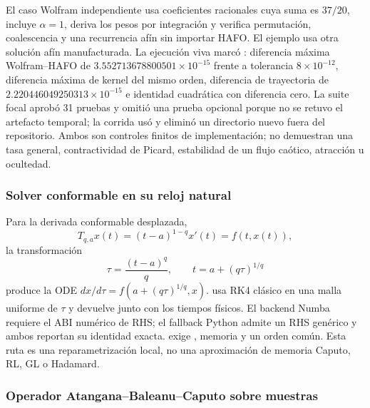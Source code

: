 El caso Wolfram independiente usa coeficientes racionales cuya suma es
\(37/20\), incluye \(\alpha=1\), deriva los pesos por integración y verifica
permutación, coalescencia y una recurrencia afín sin importar HAFO. El ejemplo
 usa otra solución afín manufacturada.
La ejecución viva marcó : diferencia máxima
Wolfram--HAFO de \(3.552713678800501\times10^{-15}\) frente a tolerancia
\(8\times10^{-12}\), diferencia máxima de kernel del mismo orden, diferencia
de trayectoria de \(2.220446049250313\times10^{-15}\) e identidad cuadrática
con diferencia cero. La suite focal aprobó 31 pruebas y omitió una prueba
opcional porque no se retuvo el artefacto temporal; la corrida usó y eliminó un
directorio nuevo fuera del repositorio.
Ambos son controles finitos de implementación; no demuestran una tasa general,
contractividad de Picard, estabilidad de un flujo caótico, atracción u
ocultedad.

\subsubsection{Solver conformable en su reloj natural}

Para la derivada conformable desplazada,
\[
 T_{q,a}x(t)=(t-a)^{1-q}x'(t)=f(t,x(t)),
\]
la transformación
\[
 \tau=\frac{(t-a)^q}{q},\qquad
 t=a+(q\tau)^{1/q}
\]
produce la ODE \(dx/d\tau=f(a+(q\tau)^{1/q},x)\).
 usa RK4 clásico en una malla uniforme de
\(\tau\) y devuelve  junto con los tiempos físicos. El
backend Numba requiere el ABI numérico de RHS; el fallback Python admite un RHS
genérico y ambos reportan su identidad exacta. 
exige , memoria
 y un orden común. Esta ruta es una reparametrización local, no
una aproximación de memoria Caputo, RL, GL o Hadamard.

\subsubsection{Operador Atangana--Baleanu--Caputo sobre muestras}

